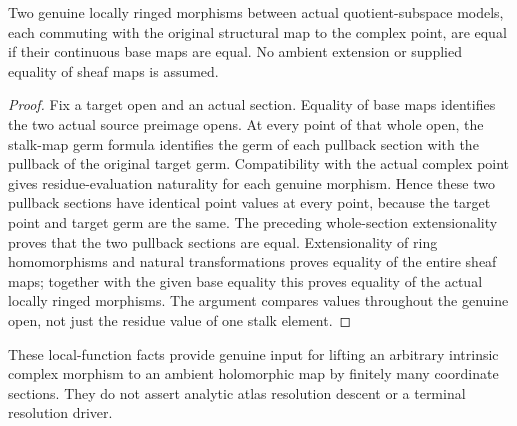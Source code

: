 \begin{theorem}
\label{hir:actual-analytic-subspace-intrinsic-map-faithful}
\leanok
Two genuine locally ringed morphisms between actual quotient-subspace
models, each commuting with the original structural map to the complex
point, are equal if their continuous base maps are equal. No ambient
extension or supplied equality of sheaf maps is assumed.
\end{theorem}
\begin{proof}
Fix a target open and an actual section. Equality of base maps identifies
the two actual source preimage opens. At every point of that whole open,
the stalk-map germ formula identifies the germ of each pullback section
with the pullback of the original target germ. Compatibility with the
actual complex point gives residue-evaluation naturality for each genuine
morphism. Hence these two pullback sections have identical point values
at every point, because the target point and target germ are the same.
The preceding whole-section extensionality proves that the two pullback
sections are equal. Extensionality of ring homomorphisms and natural
transformations proves equality of the entire sheaf maps; together with
the given base equality this proves equality of the actual locally ringed
morphisms. The argument compares values throughout the genuine open,
not just the residue value of one stalk element.
\end{proof}

These local-function facts provide genuine input for lifting an arbitrary
intrinsic complex morphism to an ambient holomorphic map by finitely many
coordinate sections. They do not assert analytic atlas resolution descent
or a terminal resolution driver.
